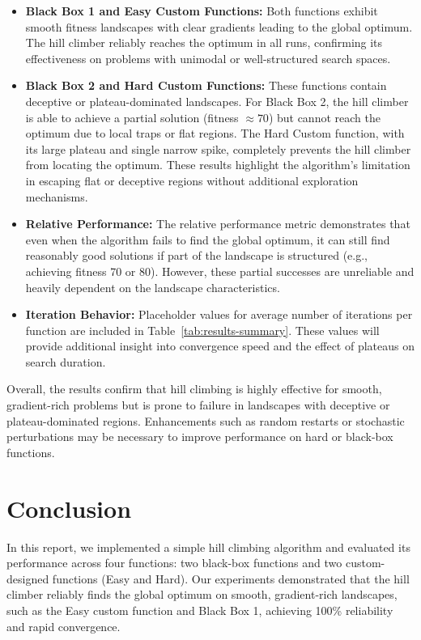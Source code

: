 \documentclass[11pt]{article}
\begin{document}
\begin{itemize}
    \item \textbf{Black Box 1 and Easy Custom Functions:} Both functions exhibit smooth fitness landscapes with clear gradients leading to the global optimum. The hill climber reliably reaches the optimum in all runs, confirming its effectiveness on problems with unimodal or well-structured search spaces.
    
    \item \textbf{Black Box 2 and Hard Custom Functions:} These functions contain deceptive or plateau-dominated landscapes. For Black Box 2, the hill climber is able to achieve a partial solution (fitness $\approx 70$) but cannot reach the optimum due to local traps or flat regions. The Hard Custom function, with its large plateau and single narrow spike, completely prevents the hill climber from locating the optimum. These results highlight the algorithm's limitation in escaping flat or deceptive regions without additional exploration mechanisms.
    
    \item \textbf{Relative Performance:} The relative performance metric demonstrates that even when the algorithm fails to find the global optimum, it can still find reasonably good solutions if part of the landscape is structured (e.g., achieving fitness 70 or 80). However, these partial successes are unreliable and heavily dependent on the landscape characteristics.
    
    \item \textbf{Iteration Behavior:} Placeholder values for average number of iterations per function are included in Table~\ref{tab:results-summary}. These values will provide additional insight into convergence speed and the effect of plateaus on search duration.
\end{itemize}

Overall, the results confirm that hill climbing is highly effective for smooth, gradient-rich problems but is prone to failure in landscapes with deceptive or plateau-dominated regions. Enhancements such as random restarts or stochastic perturbations may be necessary to improve performance on hard or black-box functions.


\section{Conclusion}
\label{section-conclusion}
In this report, we implemented a simple hill climbing algorithm and evaluated its performance across four functions: two black-box functions and two custom-designed functions (Easy and Hard). Our experiments demonstrated that the hill climber reliably finds the global optimum on smooth, gradient-rich landscapes, such as the Easy custom function and Black Box 1, achieving 100\% reliability and rapid convergence.  
\end{document}
